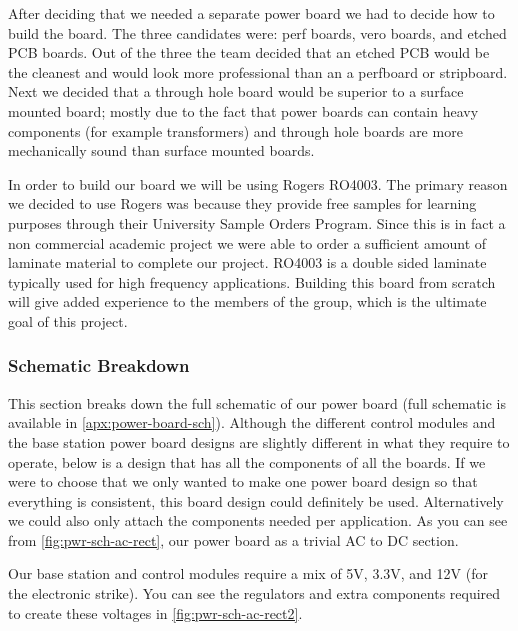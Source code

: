 After deciding that we needed a separate power board we had to decide how to
build the board. The three candidates were: perf boards, vero boards, and
etched PCB boards. Out of the three the team decided that an etched PCB would
be the cleanest and would look more professional than an a perfboard or
stripboard. Next we decided that a through hole board would be superior to a
surface mounted board; mostly due to the fact that power boards can contain
heavy components (for example transformers) and through hole boards are more
mechanically sound than surface mounted boards.

In order to build our board we will be using Rogers RO4003. The primary reason
we decided to use Rogers was because they provide free samples for learning
purposes through their University Sample Orders Program. Since this is in fact
a non commercial academic project we were able to order a sufficient amount of
laminate material to complete our project.  RO4003 is a double sided laminate
typically used for high frequency applications. Building this board from
scratch will give added experience to the members of the group, which is the
ultimate goal of this project.

\subsubsection{Schematic Breakdown}
This section breaks down the full schematic of our power board (full schematic
is available in \autoref{apx:power-board-sch}). Although the different control
modules and the base station power board designs are slightly different in what
they require to operate, below is a design that has all the components of all
the boards. If we were to choose that we only wanted to make one power board
design so that everything is consistent, this board design could definitely be
used. Alternatively we could also only attach the components needed per
application. As you can see from \autoref{fig:pwr-sch-ac-rect}, our power board
as a trivial AC to DC section.


Our base station and control modules require a mix of 5V, 3.3V, and 12V (for the electronic strike). You can see the regulators and extra components required to create these voltages in \autoref{fig:pwr-sch-ac-rect2}.


